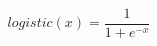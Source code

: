 \documentclass{article}
\begin{document}
\[ {logistic(x)} = \frac{1}{1 + {e}^{-x}} \]
\end{document}
